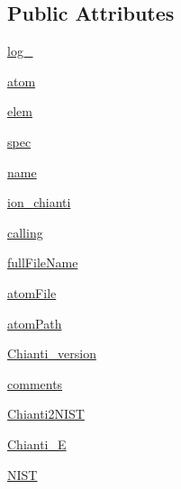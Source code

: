 \subsection*{Public Attributes}
\begin{DoxyCompactItemize}
\item 
\hyperlink{classpyneb_1_1utils_1_1pn__chianti_1_1___atom_chianti_afd87151907f32bc0dc45f0171b61374e}{log\+\_\+}
\item 
\hyperlink{classpyneb_1_1utils_1_1pn__chianti_1_1___atom_chianti_a0c5c7091b1d8a95d9bee2744d713f5c9}{atom}
\item 
\hyperlink{classpyneb_1_1utils_1_1pn__chianti_1_1___atom_chianti_a62e73dc66c7aff7941c5ce94e808c23a}{elem}
\item 
\hyperlink{classpyneb_1_1utils_1_1pn__chianti_1_1___atom_chianti_adaf1b66faf18504ec4b5c8c0b7f6763b}{spec}
\item 
\hyperlink{classpyneb_1_1utils_1_1pn__chianti_1_1___atom_chianti_ab74e6bf80237ddc4109968cedc58c151}{name}
\item 
\hyperlink{classpyneb_1_1utils_1_1pn__chianti_1_1___atom_chianti_afcfd897e5617cc9f3a7239ef78e821ee}{ion\+\_\+chianti}
\item 
\hyperlink{classpyneb_1_1utils_1_1pn__chianti_1_1___atom_chianti_ab25fa7ebe84b603684dee62410c1e34c}{calling}
\item 
\hyperlink{classpyneb_1_1utils_1_1pn__chianti_1_1___atom_chianti_a6df8c03c050eea50de355d36d398c5b8}{full\+File\+Name}
\item 
\hyperlink{classpyneb_1_1utils_1_1pn__chianti_1_1___atom_chianti_afa3c4660b3bcf1e2c199413048b9209e}{atom\+File}
\item 
\hyperlink{classpyneb_1_1utils_1_1pn__chianti_1_1___atom_chianti_a18178a28ecf0c7f251d0974c2097b214}{atom\+Path}
\item 
\hyperlink{classpyneb_1_1utils_1_1pn__chianti_1_1___atom_chianti_a1caebb547c4fc66d6e9136a4009d8010}{Chianti\+\_\+version}
\item 
\hyperlink{classpyneb_1_1utils_1_1pn__chianti_1_1___atom_chianti_a64b8b36116751d566275b722e40bb3a7}{comments}
\item 
\hyperlink{classpyneb_1_1utils_1_1pn__chianti_1_1___atom_chianti_a48e401b4ff0a724d7b4d697b02a59846}{Chianti2\+N\+I\+S\+T}
\item 
\hyperlink{classpyneb_1_1utils_1_1pn__chianti_1_1___atom_chianti_a12aa769742ad8da0e534425ac0d52c86}{Chianti\+\_\+\+E}
\item 
\hyperlink{classpyneb_1_1utils_1_1pn__chianti_1_1___atom_chianti_a6d03226c81aa049b486e97a3462a794b}{N\+I\+S\+T}

\end{DoxyCompactItemize}
